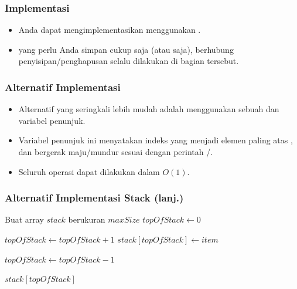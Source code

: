 \begin{frame}
\frametitle{Implementasi }
\begin{itemize}
  \item Anda dapat mengimplementasikan  menggunakan .
  \item {} yang perlu Anda simpan cukup  saja (atau  saja), berhubung penyisipan/penghapusan selalu dilakukan di bagian tersebut.
\end{itemize}
\end{frame}

\begin{frame}
\frametitle{Alternatif Implementasi }
\begin{itemize}
  \item Alternatif yang seringkali lebih mudah adalah menggunakan sebuah  dan variabel penunjuk.
  \item Variabel penunjuk ini menyatakan indeks  yang menjadi elemen paling atas , dan bergerak maju/mundur sesuai dengan perintah /.
  \item Seluruh operasi dapat dilakukan dalam $O(1)$.
\end{itemize}
\end{frame}

\begin{frame}
\frametitle{Alternatif Implementasi Stack (lanj.)}
\begin{codebox}
\li \Comment Buat array $stack$ berukuran $maxSize$
\li $topOfStack \gets 0$
\end{codebox}

\begin{codebox}
\li $topOfStack \gets topOfStack + 1$
\li $stack[topOfStack] \gets item$
\end{codebox}

\begin{codebox}
\li $topOfStack \gets topOfStack - 1$
\end{codebox}

\begin{codebox}
\li \Return $stack[topOfStack]$
\end{codebox}

\end{frame}

